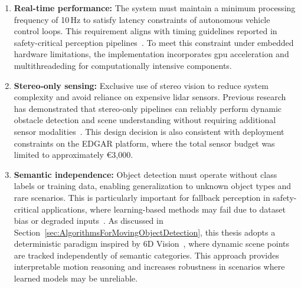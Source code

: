 \begin{enumerate}
  \item \textbf{Real-time performance:} The system must maintain a minimum
processing frequency of 10\,Hz to satisfy latency constraints of autonomous
vehicle control loops. This requirement aligns with timing guidelines reported
in safety-critical perception pipelines~\cite{req_freq}. To meet this
constraint under embedded hardware limitations, the implementation incorporates
gpu acceleration and multithreadeding for computationally intensive components.

  \item \textbf{Stereo‑only sensing:} Exclusive use of stereo vision to reduce
    system complexity and avoid reliance on expensive lidar sensors.
    Previous research has demonstrated that stereo-only pipelines can reliably
    perform dynamic obstacle detection and scene understanding without requiring
    additional sensor modalities~\cite{eppenberger_leveraging_2020, ess_moving_2009}. This design decision is also consistent with
    deployment constraints on the EDGAR platform, where the total sensor budget was
    limited to approximately €3,000.

  \item \textbf{Semantic independence:} Object detection must operate without
    class labels or training data, enabling generalization to unknown object types
    and rare scenarios. This is particularly important for fallback perception in
    safety-critical applications, where learning-based methods may fail due to
    dataset bias or degraded inputs~\cite{learning_based_perception_survey}.
    As discussed in Section~\ref{sec:AlgorithmsForMovingObjectDetection}, this
    thesis adopts a deterministic paradigm inspired by 6D Vision~\cite{6d_vision_daimler},
    where dynamic scene points are tracked independently of semantic categories.
    This approach provides interpretable motion reasoning and increases robustness
    in scenarios where learned models may be unreliable.


\end{enumerate}
